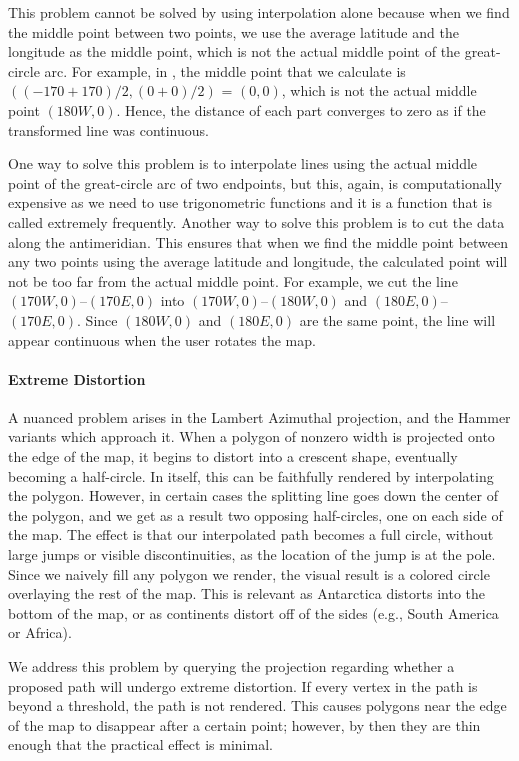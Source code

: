 This problem cannot be solved by using interpolation alone because when we find the middle point between two points, we use the average latitude and the longitude as the middle point, which is not the actual middle point of the great-circle arc. For example, in , the middle point that we calculate is $((-170+170)/2,(0+0)/2)$ = $(0, 0)$, which is not the actual middle point $(180W, 0)$. Hence, the distance of each part converges to zero as if the transformed line was continuous.

One way to solve this problem is to interpolate lines using the actual middle point of the great-circle arc of two endpoints, but this, again, is computationally expensive as we need to use trigonometric functions and it is a function that is called extremely frequently. Another way to solve this problem is to cut the data along the antimeridian. This ensures that when we find the middle point between any two points using the average latitude and longitude, the calculated point will not be too far from the actual middle point. For example, we cut the line $(170W, 0)$--$(170E, 0)$ into $(170W, 0)$--$(180W, 0)$  and $(180E, 0)$--$(170E, 0)$. Since $(180W, 0)$ and $(180E, 0)$ are the same point, the line will appear continuous when the user rotates the map.

\paragraph{Extreme Distortion}
A nuanced problem arises in the Lambert Azimuthal projection, and the Hammer
  variants which approach it.
When a polygon of nonzero width is projected onto the edge of the map, it
  begins to distort into a crescent shape, eventually becoming a half-circle.
In itself, this can be faithfully rendered by interpolating the polygon.
However, in certain cases the splitting line goes down the center of the
  polygon, and we get as a result two opposing half-circles, one on each side
  of the map.
The effect is that our interpolated path becomes a full circle, without large
  jumps or visible discontinuities, as the location of the jump is at the pole.
Since we naively fill any polygon we render, the visual result is a colored
  circle overlaying the rest of the map.
This is relevant as Antarctica distorts into the bottom of the map, or as
  continents distort off of the sides (e.g., South America or Africa).

We address this problem by querying the projection regarding whether a
  proposed path will undergo extreme distortion.
If every vertex in the path is beyond a threshold, the path is not rendered.
This causes polygons near the edge of the map to disappear after a certain
  point; however, by then they are thin enough that the practical effect is
  minimal.


